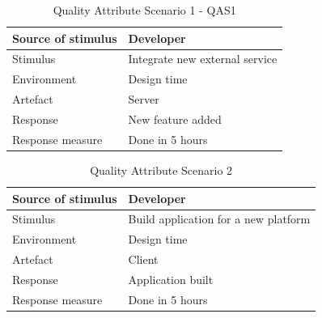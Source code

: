 \documentclass[11pt]{book}
\begin{document}
\begin{table}[H]
  \centering
  \begin{tabular}{| l | p{11cm} |} \hline
    Source of stimulus   & Developer                                   \\ \hline
    Stimulus             & Integrate new external service              \\ \hline
    Environment          & Design time                                 \\ \hline
    Artefact             & Server                                      \\ \hline
    Response             & New feature added                           \\ \hline
    Response measure     & Done in 5 hours                             \\ \hline
  \end{tabular}
  \caption{Quality Attribute Scenario 1 - QAS1}
  \label{tab:TC_qas_newservice}
\end{table}

\begin{table}[H]
  \centering
  \begin{tabular}{| l | p{11cm} |} \hline
    Source of stimulus   & Developer                                   \\ \hline
    Stimulus             & Build application for a new platform        \\ \hline
    Environment          & Design time                                 \\ \hline
    Artefact             & Client                                      \\ \hline
    Response             & Application built                           \\ \hline
    Response measure     & Done in 5 hours                             \\ \hline
  \end{tabular}
  \caption{Quality Attribute Scenario 2}
  \label{tab:TC_qas_newplatform}
\end{table}
\end{document}
